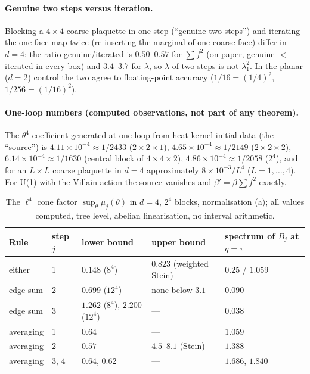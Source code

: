 \documentclass[11pt,a4paper]{article}
\theoremstyle{definition}
\theoremstyle{remark}
\begin{document}
\paragraph{Genuine two steps versus iteration.}
Blocking a $4\times4$ coarse plaquette in one step (``genuine two steps'') and iterating the one-face map twice (re-inserting the marginal of one coarse face) differ in $d=4$: the ratio genuine/iterated is $0.50$--$0.57$ for $\sum f^2$ (on paper, genuine $<$ iterated in every box) and $3.4$--$3.7$ for $\lambda$, so $\lambda$ of two steps is not $\lambda_1^2$. In the planar ($d=2$) control the two agree to floating-point accuracy ($1/16=(1/4)^2$, $1/256=(1/16)^2$).

\paragraph{One-loop numbers (computed observations, not part of any theorem).}
The $\theta^4$ coefficient generated at one loop from heat-kernel initial data (the ``source'') is $4.11\times10^{-4}\approx1/2433$ ($2\times2\times1$), $4.65\times10^{-4}\approx1/2149$ ($2\times2\times2$), $6.14\times10^{-4}\approx1/1630$ (central block of $4\times4\times2$), $4.86\times10^{-4}\approx1/2058$ ($2^4$), and for an $L\times L$ coarse plaquette in $d=4$ approximately $8\times10^{-3}/L^4$ ($L=1,\dots,4$). For U(1) with the Villain action the source vanishes and $\beta'=\beta\sum f^2$ exactly.

\begin{table}[h]\centering\small
\caption{The $\ell^4$ cone factor $\sup_\theta\mu_j(\theta)$ in $d=4$, $2^4$ blocks, normalisation (a); all values computed, tree level, abelian linearisation, no interval arithmetic.}\label{tab:cone}
\begin{tabular}{@{}lllll@{}}
\toprule
Rule & step $j$ & lower bound & upper bound & spectrum of $B_j$ at $q=\pi$\\ \midrule
either & 1 & $0.148$ ($8^4$) & $0.823$ (weighted Stein) & $0.25$ / $1.059$\\
edge sum & 2 & $0.699$ ($12^4$) & none below $3.1$ & $0.090$\\
edge sum & 3 & $1.262$ ($8^4$), $2.200$ ($12^4$) & --- & $0.038$\\
averaging & 1 & $0.64$ & --- & $1.059$\\
averaging & 2 & $0.57$ & $4.5$--$8.1$ (Stein) & $1.388$\\
averaging & 3, 4 & $0.64$, $0.62$ & --- & $1.686$, $1.840$\\
\bottomrule
\end{tabular}
\end{table}
\end{document}
